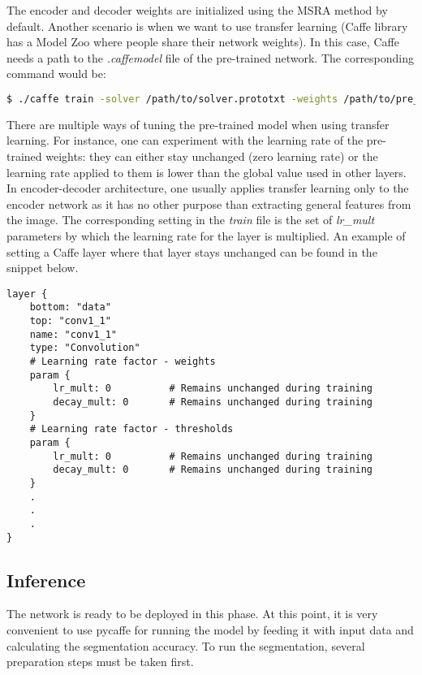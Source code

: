The encoder and decoder weights are initialized using the MSRA method by default. Another scenario is when we want to use transfer learning (Caffe library has a Model Zoo where people share their network weights). In this case, Caffe needs a path to the \textit{.caffemodel} file of the pre-trained network. The corresponding command would be:

\begin{lstlisting}[language=bash]
$ ./caffe train -solver /path/to/solver.prototxt -weights /path/to/pre_trained_weights.caffemodel
\end{lstlisting}

There are multiple ways of tuning the pre-trained model when using transfer learning. For instance, one can experiment with the learning rate of the pre-trained weights: they can either stay unchanged (zero learning rate) or the learning rate applied to them is lower than the global value used in other layers. \cite{stanford-github} In encoder-decoder architecture, one usually applies transfer learning only to the encoder network as it has no other purpose than extracting general features from the image. The corresponding setting in the \textit{train} file is the set of \textit{lr\_mult} parameters by which the learning rate for the layer is multiplied. An example of setting a Caffe layer where that layer stays unchanged can be found in the snippet below.

\begin{lstlisting}[caption={Setting up \textit{train.prototxt} for transfer learning \cite{filip_github}},captionpos=b]
layer {
	bottom: "data"
	top: "conv1_1"
	name: "conv1_1"
	type: "Convolution"
	# Learning rate factor - weights
	param {
		lr_mult: 0			# Remains unchanged during training
		decay_mult: 0		# Remains unchanged during training
	}
	# Learning rate factor - thresholds
	param {
		lr_mult: 0			# Remains unchanged during training
		decay_mult: 0		# Remains unchanged during training
	}
	.
	.
	.
}
\end{lstlisting}


\newpage
\subsection{Inference}

The network is ready to be deployed in this phase. At this point, it is very convenient to use pycaffe for running the model by feeding it with input data and calculating the segmentation accuracy. To run the segmentation, several preparation steps must be taken first.


